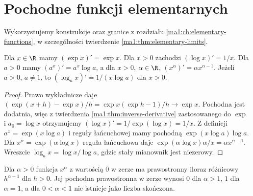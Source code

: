 \section{Pochodne funkcji elementarnych}
Wykorzystujemy konstrukcje oraz granice z rozdziału \ref{ma1:ch:elementary-functions}, w szczególności twierdzenie \ref{ma1:thm:elementary-limits}.
\begin{twierdzenie}
\label{ma1:thm:exp-log-derivatives}
Dla $x\in\R$ mamy $(\exp x)'=\exp x$. Dla $x>0$ zachodzi $(\log x)'=1/x$. Dla $a>0$ mamy $(a^x)'=a^x\log a$, a dla $x>0$, $\alpha\in\R$,
$(x^\alpha)'=\alpha x^{\alpha-1}$. Jeżeli $a>0$, $a\ne1$, to $(\log_a x)'=1/(x\log a)$ dla $x>0$.
\end{twierdzenie}
\begin{proof}
Prawo wykładnicze daje
$(\exp(x+h)-\exp x)/h=\exp x(\exp h-1)/h\to\exp x$.
Pochodna jest dodatnia, więc z twierdzenia \ref{ma1:thm:inverse-derivative} zastosowanego do $\exp$ i $a_0=\log x$ otrzymujemy $(\log x)'=1/\exp(\log x)=1/x$.
Z definicji $a^x=\exp(x\log a)$ i reguły łańcuchowej mamy pochodną $\exp(x\log a)\log a$. Dla $x^\alpha=\exp(\alpha\log x)$ reguła łańcuchowa daje $\exp(\alpha\log x)\alpha/x=\alpha x^{\alpha-1}$. Wreszcie $\log_a x=\log x/\log a$, gdzie stały mianownik jest niezerowy.
\end{proof}
Dla $\alpha>0$ funkcja $x^\alpha$ z wartością $0$ w zerze ma prawostronny iloraz różnicowy $h^{\alpha-1}$ dla $h>0$. Jej pochodna prawostronna w zerze wynosi $0$ dla $\alpha>1$, $1$ dla $\alpha=1$, a dla $0<\alpha<1$ nie istnieje jako liczba skończona.

